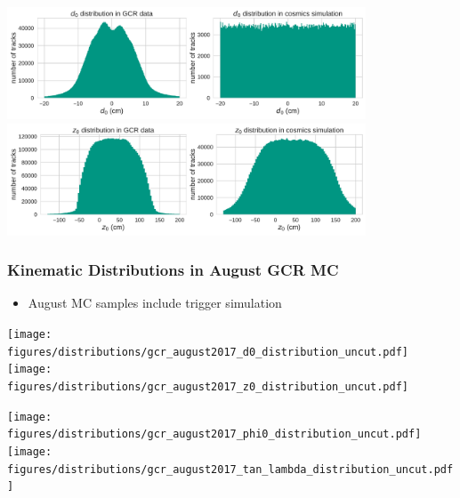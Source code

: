 \documentclass[18pt]{beamer}
\begin{document}
  \begin{frame}
    \begin{center}
      \includegraphics[width=0.8\textwidth]{figures/distributions/gcr_d0_distribution_uncut.pdf}\\
      \includegraphics[width=0.8\textwidth]{figures/distributions/gcr_z0_distribution_uncut.pdf}
    \end{center}
  \end{frame}

  \begin{frame}
    \frametitle{Kinematic Distributions in August GCR MC}
    \begin{itemize}
    \item August MC samples include trigger simulation
    \end{itemize}
    \begin{center}
      \texttt{[image: figures/distributions/gcr\_august2017\_d0\_distribution\_uncut.pdf]}
      \texttt{[image: figures/distributions/gcr\_august2017\_z0\_distribution\_uncut.pdf]}
    \end{center}
  \end{frame}

  \begin{frame}
    \begin{center}
      \texttt{[image: figures/distributions/gcr\_august2017\_phi0\_distribution\_uncut.pdf]}
      \texttt{[image: figures/distributions/gcr\_august2017\_tan\_lambda\_distribution\_uncut.pdf]}
    \end{center}
  \end{frame}
\end{document}
